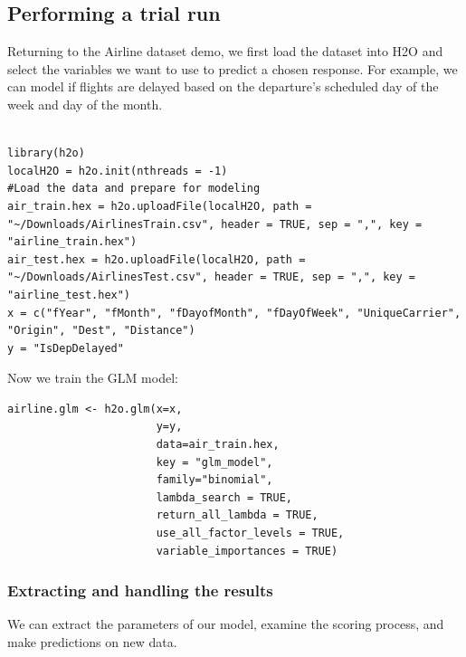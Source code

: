 \documentclass{article}[11pt]
\begin{document}
\subsection{Performing a trial run} \label{3.2}
Returning to the Airline dataset demo, we first load the dataset into H2O and select the variables we want to use to predict a chosen response. For example, we can model if flights are delayed based on the departure's scheduled day of the week and day of the month.

\begin{lstlisting}[breaklines,basicstyle=\ttfamily]

library(h2o)
localH2O = h2o.init(nthreads = -1)
#Load the data and prepare for modeling
air_train.hex = h2o.uploadFile(localH2O, path = "~/Downloads/AirlinesTrain.csv", header = TRUE, sep = ",", key = "airline_train.hex")
air_test.hex = h2o.uploadFile(localH2O, path = "~/Downloads/AirlinesTest.csv", header = TRUE, sep = ",", key = "airline_test.hex")
x = c("fYear", "fMonth", "fDayofMonth", "fDayOfWeek", "UniqueCarrier", "Origin", "Dest", "Distance")
y = "IsDepDelayed"

\end{lstlisting}

Now we train the GLM model:

\begin{lstlisting}[breaklines,basicstyle=\ttfamily]
airline.glm <- h2o.glm(x=x,
                       y=y,
                       data=air_train.hex,
                       key = "glm_model",
                       family="binomial",
                       lambda_search = TRUE,
                       return_all_lambda = TRUE,
                       use_all_factor_levels = TRUE,
                       variable_importances = TRUE)
\end{lstlisting}

\subsubsection{Extracting and handling the results} \label{3.2.1}

We can extract the parameters of our model, examine the scoring process, and make predictions on new data.
\end{document}

